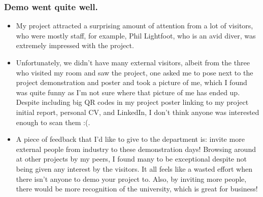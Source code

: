 \subsubsection{Demo went quite well.}

\begin{itemize}
    \item My project attracted a surprising amount of attention from a lot of visitors, who were mostly staff, for example, Phil Lightfoot, who is an avid diver, was extremely impressed with the project.
    \item Unfortunately, we didn't have many external visitors, albeit from the three who visited my room and saw the project, one asked me to pose next to the project demonstration and poster and took a picture of me, which I found was quite funny as I'm not sure where that picture of me has ended up. Despite including big QR codes in my project poster linking to my project initial report, personal CV, and LinkedIn, I don't think anyone was interested enough to scan them :(.
    \item A piece of feedback that I'd like to give to the department is: invite more external people from industry to these demonstration days! Browsing around at other projects by my peers, I found many to be exceptional despite not being given any interest by the visitors. It all feels like a wasted effort when there isn't anyone to demo your project to. Also, by inviting more people, there would be more recognition of the university, which is great for business!
\end{itemize}

